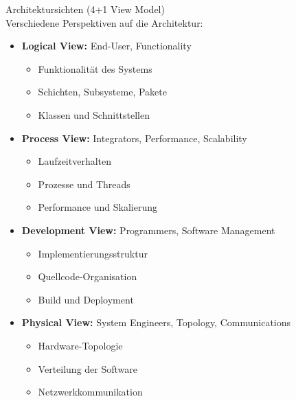 \begin{concept}{Architektursichten (4+1 View Model)}\\
Verschiedene Perspektiven auf die Architektur:

\begin{itemize}
    \item \textbf{Logical View:} End-User, Functionality
    \begin{itemize}
        \item Funktionalität des Systems
        \item Schichten, Subsysteme, Pakete
        \item Klassen und Schnittstellen
    \end{itemize}
    
    \item \textbf{Process View:} Integrators, Performance, Scalability
    \begin{itemize}
        \item Laufzeitverhalten
        \item Prozesse und Threads
        \item Performance und Skalierung
    \end{itemize}

    \item \textbf{Development View:} Programmers, Software Management
    \begin{itemize}
        \item Implementierungsstruktur
        \item Quellcode-Organisation
        \item Build und Deployment
    \end{itemize}
    
    \item \textbf{Physical View:} System Engineers, Topology, Communications
    \begin{itemize}
        \item Hardware-Topologie
        \item Verteilung der Software
        \item Netzwerkkommunikation
    \end{itemize}
\end{itemize}


\end{concept}
